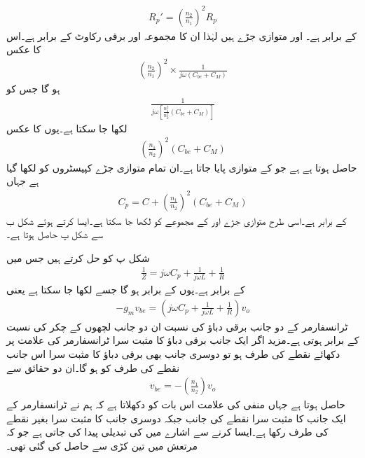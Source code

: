 \begin{align*}
R_p'=\left(\frac{n_2}{n_1} \right)^2 R_p
\end{align*}
کے برابر ہے۔ اور  متوازی جڑے ہیں لہٰذا ان کا مجموعہ  اور برقی رکاوٹ  کے برابر ہے۔اس کا عکس
\begin{align*}
\left(\frac{n_2}{n_1} \right)^2  \times \frac{1}{j \omega \left(C_{be}+C_M \right)}
\end{align*}
ہو گا جس کو
\begin{align*}
\frac{1}{j \omega \left[\frac{n_1^2}{n_2^2} \left(C_{be}+C_M \right)\right]}
\end{align*}
لکھا جا سکتا ہے۔یوں  کا عکس
 \begin{align*}
\left(\frac{n_1}{n_2} \right)^2 \left(C_{be}+C_M \right)
\end{align*}
حاصل ہوتا ہے ہے جو  کے متوازی پایا جاتا ہے۔ان تمام متوازی جڑے کپیسٹروں کو  لکھا گیا ہے جہاں
\begin{align*}
C_p = C +\left(\frac{n_1}{n_2} \right)^2 \left(C_{be}+C_M \right)
\end{align*}
کے برابر ہے۔اسی طرح متوازی جڑے  اور  کے مجموعے کو  لکھا جا سکتا ہے۔ایسا کرتے ہوئے شکل  ب سے شکل  پ حاصل ہوتا ہے۔


شکل  پ کو حل کرتے ہیں جس میں
\begin{align*}
\frac{1}{Z}=j \omega C_p +\frac{1}{j \omega L} +\frac{1}{R}
\end{align*}
کے برابر ہے۔یوں  کے برابر ہو گا جسے  لکھا جا سکتا ہے یعنی
\begin{align} \label{مساوات_ہمسر_الف}
-g_m v_{be}=\left(j \omega C_p +\frac{1}{j \omega L} +\frac{1}{R} \right) v_o
\end{align}
ٹرانسفارمر کے دو جانب برقی دباؤ کی نسبت  ان دو جانب لچھوں کے چکر کی نسبت کے برابر ہوتی ہے۔مزید اگر ایک جانب برقی دباؤ کا مثبت سرا ٹرانسفارمر کی علامت پر دکھائے نقطے  کی طرف ہو تو دوسری جانب بھی برقی دباؤ کا مثبت سرا اس جانب نقطے  کی طرف کو ہو گا۔ان دو حقائق سے
\begin{align*}
v_{be}=-\left(\frac{n_1}{n_2} \right) v_o
\end{align*}
حاصل ہوتا ہے جہاں منفی کی علامت اس بات کو دکھلاتا ہے کہ ہم نے ٹرانسفارمر کے ایک جانب  کا مثبت سرا نقطے  کی جانب جبکہ دوسری جانب  کا مثبت سرا بغیر نقطے  کی طرف رکھا ہے۔ایسا کرنے سے اشارے میں  کی تبدیلی پیدا کی جاتی ہے جو کہ  مرتعش میں تین کڑی  سے حاصل کی گئی تھی۔

